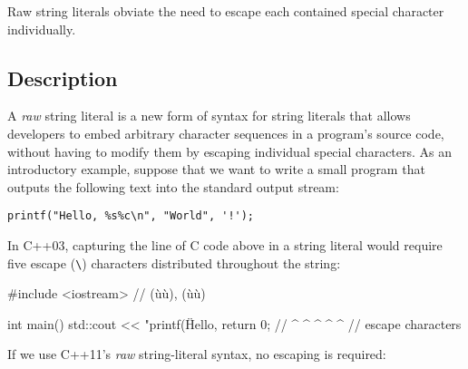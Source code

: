 
\setcounter{table}{0}
\setcounter{footnote}{0}
\setcounter{lstlisting}{0}

Raw string literals obviate the need to escape each contained special
character individually.

\subsection[Description]{Description}\label{description}

A \emph{raw} string literal is a new form of syntax for string literals
that allows developers to embed arbitrary character sequences in a
program's source code, without having to modify them by escaping
individual special characters. As an introductory example, suppose that
we want to write a small program that outputs the following text into the standard output stream:

\begin{lstlisting}[style=plain]
printf("Hello, %s%c\n", "World", '!');
\end{lstlisting}

\noindent In C++03, capturing the line of C code above in a string literal would
require five escape (\lstinline!\!) characters distributed
throughout the string:

\begin{emcppslisting}
#include <iostream>  // (ù{}ù), (ù{}ù)

int main()
{
    std::cout << "printf(\"Hello, %
    return 0;  //        ^            ^  ^   ^      ^
               //             escape characters
}
\end{emcppslisting}

\noindent If we use C++11's \emph{raw} string-literal syntax, no escaping is
required:

